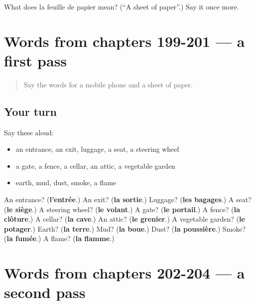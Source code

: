 \begin{tcolorbox}[breakable,colback=teal!4,colframe=teal!35!black,title={Before you move on}]
What does la feuille de papier mean? (\textquotedblleft{}A sheet of paper\textquotedblright{}.) Say it once more.
\end{tcolorbox}
\section[(dialogue)]{Words from chapters 199-201 — a first pass}

\label{lesson:FR-R204-first-pass-words-from-chapters-199-201}



\begin{quote}
Say the words for a mobile phone and a sheet of paper.
\end{quote}

\subsection*{Your turn}
Say these aloud:

\begin{itemize}
\raggedright
  \item an entrance, an exit, luggage, a seat, a steering wheel
  \item a gate, a fence, a cellar, an attic, a vegetable garden
  \item earth, mud, dust, smoke, a flame
\end{itemize}

\begin{tcolorbox}[breakable,colback=teal!4,colframe=teal!35!black,title={Before you move on}]
An entrance? (\textbf{l'entrée}.) An exit? (\textbf{la sortie}.) Luggage? (\textbf{les bagages}.) A seat? (\textbf{le siège}.) A steering wheel? (\textbf{le volant}.) A gate? (\textbf{le portail}.) A fence? (\textbf{la clôture}.) A cellar? (\textbf{la cave}.) An attic? (\textbf{le grenier}.) A vegetable garden? (\textbf{le potager}.) Earth? (\textbf{la terre}.) Mud? (\textbf{la boue}.) Dust? (\textbf{la poussière}.) Smoke? (\textbf{la fumée}.) A flame? (\textbf{la flamme}.)
\end{tcolorbox}
\section[(dialogue)]{Words from chapters 202-204 — a second pass}

\label{lesson:FR-R204-second-pass-words-from-chapters-202-204}



